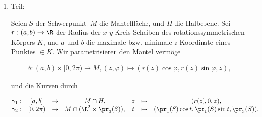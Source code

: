 \begin{solution}

\phantom{}

\begin{enumerate}[label = \arabic*.]

    \item Teil:

    Seien $S$ der Schwerpunkt, $M$ die Mantelfläche, und $H$ die Halbebene.
    Sei $r: (a, b) \to \R$ der Radius der $x$-$y$-Kreis-Scheiben des rotationssymmetrischen Körpers $K$, und $a$ und $b$ die maximale bzw. minimale $z$-Koordinate eines Punktes $\in K$.
    Wir parametrisieren den Mantel vermöge
    
    \begin{align*}
        \phi:
            (a, b) \times [0, 2 \pi) \to M,
            (z, \varphi) \mapsto (r(z) \cos \varphi, r(z) \sin \varphi, z),
    \end{align*}
    
    und die Kurven durch
    
    \begin{align*}
        \begin{matrix}
            \gamma_1: & [a, b]     & \to & M \cap H,                      & z & \mapsto & (r(z), 0, z), \\
            \gamma_2: & [0, 2 \pi) & \to & M \cap (\R^2 \times \pr_3(S)), & t & \mapsto & (\pr_1(S) \cos t, \pr_1(S) \sin t, \pr_3(S)).
        \end{matrix}
    \end{align*}
    
    \begin{center}
\end{center}
\end{enumerate}
\end{solution}
